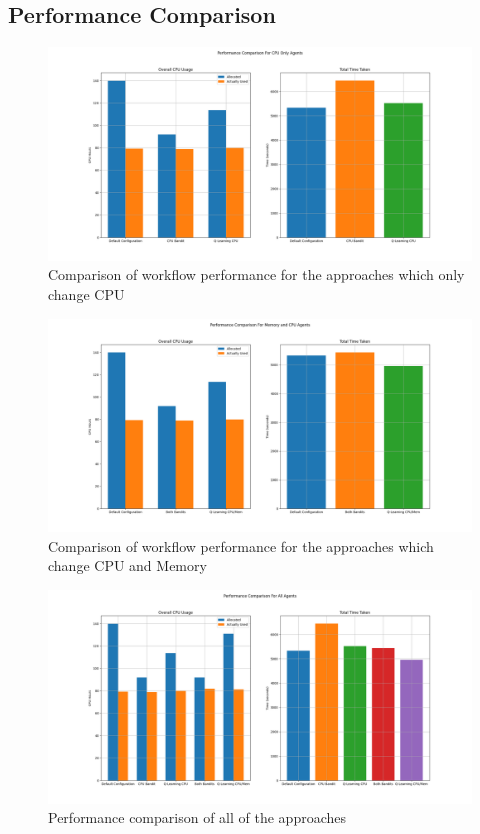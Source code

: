 \subsection{Performance Comparison}
\label{sub:comp_perf}

\begin{figure}
    \centering
        \includegraphics[width=\textwidth]{fig/cpu_only_results.png}
        \caption{Comparison of workflow performance for the approaches which only change CPU}
        \label{fig:cpu_results}
\end{figure}

\begin{figure}
    \centering
        \includegraphics[width=\textwidth]{fig/cpu_mem_results.png}
        \caption{Comparison of workflow performance for the approaches which change CPU and Memory}
        \label{fig:mem_results}
\end{figure}

\begin{figure}
    \centering
        \includegraphics[width=\textwidth]{fig/all_results.png}
        \caption{Performance comparison of all of the approaches}
        \label{fig:all_results}
\end{figure}

